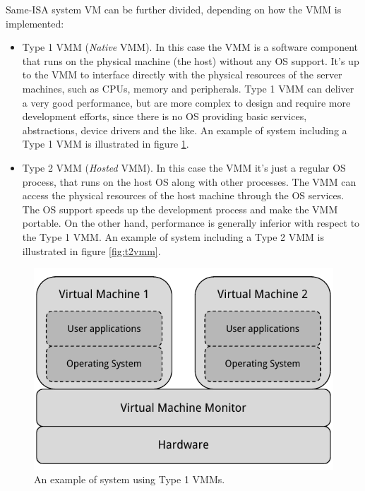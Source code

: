 Same-ISA system VM can be further divided, depending on how the VMM is implemented:
\begin{itemize}
    \item Type 1 VMM (\emph{Native} VMM). In this case the VMM is a software component that runs on the physical machine (the host) 
	  without any OS support.
	  It's up to the VMM to interface directly with the physical resources of the server machines, such as
	  CPUs, memory and peripherals. Type 1 VMM can deliver a very good performance, but are more complex to design and require
	  more development efforts, since there is no OS providing basic services, abstractions, device drivers and the like.
	  An example of system including a Type 1 VMM is illustrated in figure \ref{fig:t1vmm}.
	  
    \item Type 2 VMM (\emph{Hosted} VMM). In this case the VMM it's just a regular OS process, that runs on the host OS along with other
	  processes. The VMM can access the physical resources of the host machine through the OS services. The OS support speeds up
	  the development process and make the VMM portable. On the other hand, performance is generally inferior with respect to the
	  Type 1 VMM. An example of system including a Type 2 VMM is illustrated in figure \ref{fig:t2vmm}.
\end{itemize}

\begin{figure}[bt]
\centering
\includegraphics[scale = 1.0]{type-1-vmm.pdf}
\caption{An example of system using Type 1 VMMs.}
\label{fig:t1vmm}
\end{figure}

